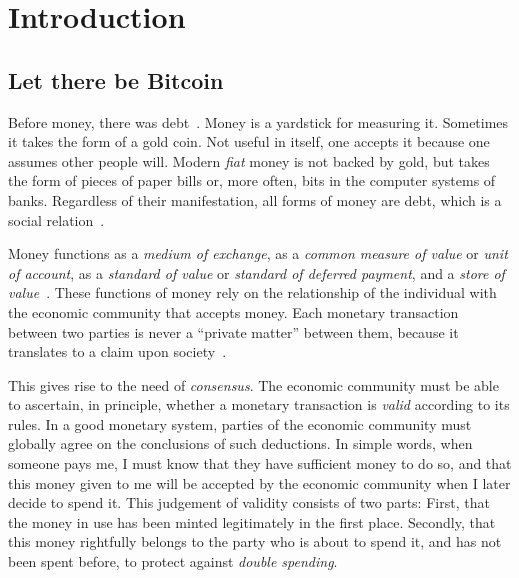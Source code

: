 \chapter{Introduction}\label{chapter:introduction}

\section{Let there be Bitcoin}
Before money, there was debt~\cite{debt}. Money is a yardstick for measuring
it. Sometimes it takes the form of a gold coin. Not useful in itself, one
accepts it because one assumes other people will. Modern \emph{fiat} money is
not backed by gold, but takes the form of pieces of paper bills or, more often,
bits in the computer systems of banks. Regardless of their manifestation, all
forms of money are debt, which is a social relation~\cite{critical-realism}.

Money functions as a \emph{medium of exchange}, as a \emph{common measure of
value} or \emph{unit of account}, as a \emph{standard of value} or
\emph{standard of deferred payment}, and a \emph{store of
value}~\cite{money-mechanism}. These functions of money rely on the relationship
of the individual with the economic community that accepts money. Each monetary
transaction between two parties is never a ``private matter'' between them,
because it translates to a claim upon society~\cite{philosophy-of-money}.

This gives rise to the need of \emph{consensus}. The economic community must be
able to ascertain, in principle, whether a monetary transaction is \emph{valid}
according to its rules. In a good monetary system, parties of the economic
community must globally agree on the conclusions of such deductions. In simple
words, when someone pays me, I must know that they have sufficient money to do
so, and that this money given to me will be accepted by the economic community
when I later decide to spend it. This judgement of validity consists of two
parts: First, that the money in use has been minted legitimately in the first
place. Secondly, that this money rightfully belongs to the party who is about to
spend it, and has not been spent before, to protect against \emph{double spending}.

